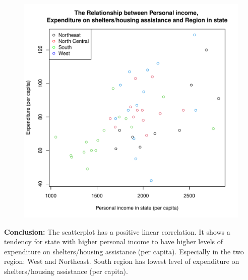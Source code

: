 \documentclass[12pt,letterpaper]{article}
\begin{document}
\begin{figure}[h!]\centering
	\caption{\footnotesize }
	\label{fig:plot_1}
	\includegraphics[width=.75\textwidth]{plot3_1.pdf}
\end{figure}

\noindent \textbf{Conclusion:} The scatterplot has a positive linear correlation. It shows a tendency for state with higher personal income to have higher levels of expenditure on shelters/housing assistance (per capita). Especially in the two region: West and Northeast. South region has lowest level of expenditure on shelters/housing assistance (per capita).
\vspace{.5cm} 
\end{document}
